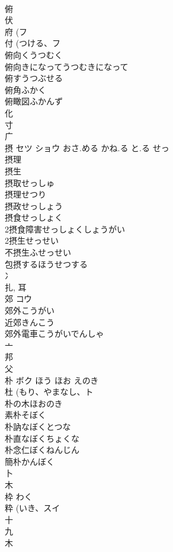 \documentclass[8pt]{extreport}
\begin{document}
\begin{CJK}{UTF8}{min}
\\	俯 
\\	伏 
\\	府 (フ 
\\	付 (つける、フ 
\\	俯向くうつむく
\\	俯向きになってうつむきになって
\\	俯すうつぶせる
\\	俯角ふかく
\\	俯瞰図ふかんず
\\	化 
\\	寸 
\\	广 
\\	摂	セツ ショウ	おさ.める かね.る と.る せっ	
\\	摂理 
\\	摂生 
\\	摂取せっしゅ
\\	摂理せつり
\\	摂政せっしょう
\\	摂食せっしょく
\\	2摂食障害せっしょくしょうがい
\\	2摂生せっせい
\\	不摂生ふせっせい
\\	包摂するほうせつする
\\	冫 
\\	扎, 耳 
\\	郊	コウ		
\\	郊外こうがい
\\	近郊きんこう
\\	郊外電車こうがいでんしゃ
\\	亠 
\\	邦 
\\	父 
\\	朴	ボク	ほう ほお えのき	
\\	杜 (もり、やまなし、ト 
\\	朴の木ほおのき 
\\	素朴そぼく 
\\	朴訥なぼくとつな 
\\	朴直なぼくちょくな 
\\	朴念仁ぼくねんじん 
\\	簡朴かんぼく 
\\	卜 
\\	木 
\\	枠		わく	
\\	粋 (いき、スイ 
\\	十 
\\	九 
\\	木 

\end{CJK}
\end{document}

